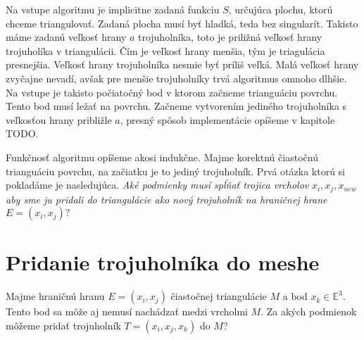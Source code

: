 Na vstupe algoritmu je implicitne zadaná funkciu $S$, určujúca plochu, ktorú chceme triangulovať. 
Zadaná plocha musí byť hladká, teda bez singularít.
Takisto máme zadanú veľkosť hrany $a$ trojuholníka, toto je priližná veľkosť hrany trojuholíka v 
triangulácii. Čím je veľkosť hrany menšia, tým je triagulácia presnejšia. Veľkosť hrany trojuholníka 
nesmie byť príliš veľká. Malá veľkosť hrany zvyčajne nevadí, avšak pre menšie trojuholníky trvá 
algoritmus omnoho dlhšie. Na vstupe je takisto počiatočný bod v ktorom začneme trianguáciu povrchu.
Tento bod musí ležať na povrchu.
Začneme vytvorením jediného trojuholníka s veľkosťou hrany približle $a$, presný spôsob implementácie
opíšeme v kapitole TODO.

Funkčnosť algoritmu opíšeme akosi indukčne. Majme korektnú čiastočnú trianguáciu povrchu, na začiatku
je to jediný trojuholník. Prvá otázka ktorú si pokladáme je nasledujúca. 
\textit{Aké podmienky musí spĺňať trojica vrcholov} $x_i, x_j, x_{new}$ 
\textit{aby sme ju pridali do triangulácie ako nový trojuholník na hraničnej hrane} $E = (x_i, x_j)?$ 

\section{Pridanie trojuholníka do meshe}

Majme hraničnú hranu $E=(x_i, x_j)$ čiastočnej triangulácie $M$ a bod $x_k \in \mathbb{E}^3$. 
Tento bod sa môže aj nemusí nachádzať medzi vrcholmi $M$. Za akých podmienok môžeme pridať trojuholník 
$T=(x_i, x_j, x_k)$ do $M$?

